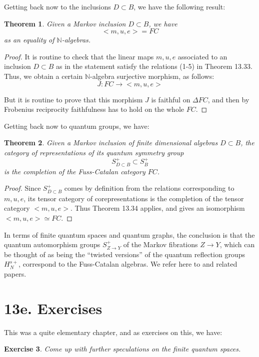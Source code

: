 \documentclass[12pt]{amsbook}
\newtheorem{theorem}{Theorem}[chapter]
\newtheorem{exercise}[theorem]{Exercise}
\begin{document}
Getting back now to the inclusions $D\subset B$, we have the following result:

\begin{theorem}
Given a Markov inclusion $D\subset B$, we have
$$<m,u,e>=FC$$
as an equality of $\mathbb N$-algebras.
\end{theorem}

\begin{proof}
It is routine to check that the linear maps $m,u,e$ associated to an inclusion $D\subset B$ as in the statement satisfy the relations (1-5) in Theorem 13.33. Thus, we obtain a certain $\mathbb N$-algebra surjective morphism, as follows:
$$J:FC\to<m,u,e>$$

But it is routine to prove that this morphism $J$ is faithful on $\Delta FC$, and then by Frobenius reciprocity faithfulness has to hold on the whole $FC$.
\end{proof}

Getting back now to quantum groups, we have:

\begin{theorem}
Given a Markov inclusion of finite dimensional algebras $D\subset B$, the category of representations of its quantum symmetry group 
$$S_{D\subset B}^+\subset S_B^+$$
is the completion of the Fuss-Catalan category $FC$.
\end{theorem}

\begin{proof}
Since $S_{D\subset B}^+$ comes by definition from the relations corresponding to $m,u,e$, its tensor category of corepresentations is the completion of the tensor category $<m,u,e>$. Thus Theorem 13.34 applies, and gives an isomorphism $<m,u,e>\simeq FC$.
\end{proof}

In terms of finite quantum spaces and quantum graphs, the conclusion is that the quantum automorphism groups $S_{Z\to Y}^+$ of the Markov fibrations $Z\to Y$, which can be thought of as being the ``twisted versions'' of the quantum reflection groups $H_N^{s+}$, correspond to the Fuss-Catalan algebras. We refer here to \cite{ba2} and related papers.

\section*{13e. Exercises}

This was a quite elementary chapter, and as exercises on this, we have:

\begin{exercise}
Come up with further speculations on the finite quantum spaces.
\end{exercise}
\end{document}
